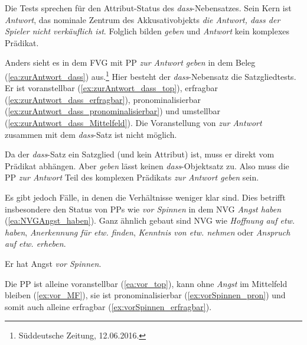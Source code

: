 Die Tests sprechen für den Attribut-Status des \textit{dass}-Nebensatzes. Sein Kern ist \textit{Antwort}, das nominale Zentrum des Akkusativobjekts \textit{die Antwort, dass der Spieler nicht verkäuflich ist}. Folglich bilden \textit{geben} und \textit{Antwort} kein komplexes Prädikat. 

Anders sieht es in dem FVG mit PP \textit{zur Antwort geben} in dem Beleg (\ref{ea:zurAntwort_dass}) aus.\footnote{Süddeutsche Zeitung, 12.06.2016.} Hier besteht der \textit{dass}-Nebensatz die Satzgliedtests. Er ist voranstellbar (\ref{ex:zurAntwort_dass_top}), erfragbar (\ref{ex:zurAntwort_dass_erfragbar}), pronominalisierbar (\ref{ex:zurAntwort_dass_pronominalisierbar}) und umstellbar (\ref{ex:zurAntwort_dass_Mittelfeld}). Die Voranstellung von \textit{zur Antwort} zusammen mit dem \textit{dass}-Satz ist nicht möglich. 

\ea \label{ea:zurAntwort_dass_SG}
\label{ea:zurAntwort_dass}
\label{ex:zurAntwort_dass_top}
\label{ex:zurAntwort_dass_erfragbar}
\label{ex:zurAntwort_dass_pronominalisierbar} 
\label{ex:zurAntwort_dass_Mittelfeld}
\label{ex:zurAntwortdass_top}
\z 
\z 

Da der \textit{dass}-Satz ein Satzglied (und kein Attribut) ist, muss er direkt vom Prädikat abhängen. Aber \textit{geben} lässt keinen \textit{dass}-Objektsatz zu. Also muss die PP \textit{zur Antwort} Teil des komplexen Prädikats \textit{zur Antwort geben} sein.  

Es gibt jedoch Fälle, in denen die Verhältnisse weniger klar sind. Dies betrifft insbesondere den Status von PPs wie \textit{vor Spinnen} in dem NVG \textit{Angst haben} (\ref{ea:NVGAngst_haben}). Ganz ähnlich gebaut sind NVG wie \textit{Hoffnung auf etw. haben}, \textit{Anerkennung für etw. finden}, \textit{Kenntnis von etw. nehmen} oder \textit{Anspruch auf etw. erheben}.  

\ea \label{ea:NVGAngst_haben} Er hat Angst \textit{vor Spinnen}.
\z 

Die PP ist alleine voranstellbar (\ref{ea:vor_top}), kann ohne \textit{Angst} im Mittelfeld bleiben (\ref{ex:vor_MF}), sie ist pronominalisierbar (\ref{ex:vorSpinnen_pron}) und somit auch alleine erfragbar (\ref{ex:vorSpinnen_erfragbar}).

